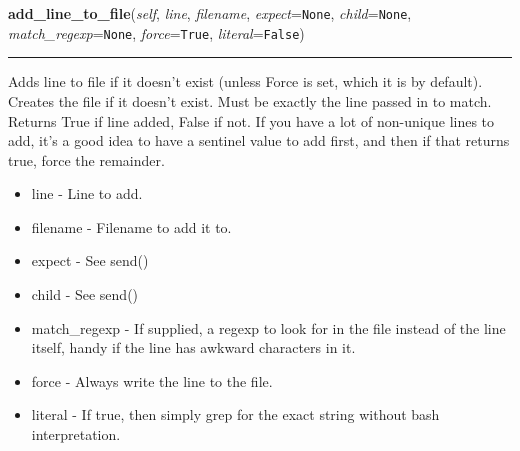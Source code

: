    \vspace{0.5ex}

\hspace{.8\funcindent}\begin{boxedminipage}{\funcwidth}

    \raggedright \textbf{add\_line\_to\_file}(\textit{self}, \textit{line}, \textit{filename}, \textit{expect}={\tt None}, \textit{child}={\tt None}, \textit{match\_regexp}={\tt None}, \textit{force}={\tt True}, \textit{literal}={\tt False})

    \vspace{-1.5ex}

    \rule{\textwidth}{0.5\fboxrule}
\setlength{\parskip}{2ex}
    Adds line to file if it doesn't exist (unless Force is set, which it is
    by default). Creates the file if it doesn't exist. Must be exactly the 
    line passed in to match. Returns True if line added, False if not. If 
    you have a lot of non-unique lines to add, it's a good idea to have a 
    sentinel value to add first, and then if that returns true, force the 
    remainder.

    \begin{itemize}
    \setlength{\parskip}{0.6ex}
      \item line         - Line to add.

      \item filename     - Filename to add it to.

      \item expect       - See send()

      \item child        - See send()

      \item match\_regexp - If supplied, a regexp to look for in the file 
        instead of the line itself, handy if the line has awkward 
        characters in it.

      \item force        - Always write the line to the file.

      \item literal      - If true, then simply grep for the exact string 
        without bash interpretation.

    \end{itemize}

\setlength{\parskip}{1ex}
    \end{boxedminipage}

    \label{shutit_global:ShutIt:add_to_bashrc}

